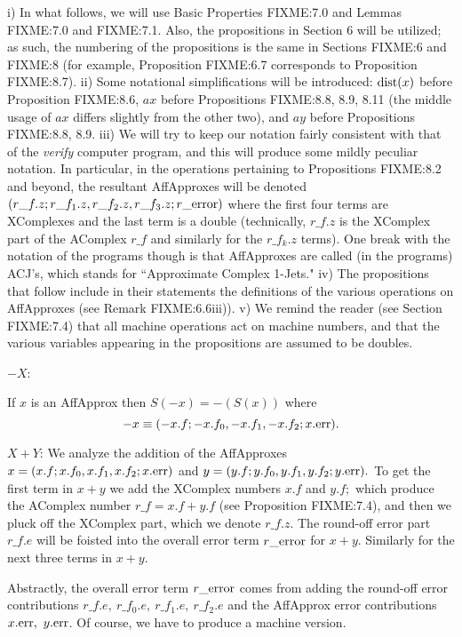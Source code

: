 i)  In what follows, we will use Basic Properties FIXME:7.0 and Lemmas FIXME:7.0 and FIXME:7.1.  Also, the propositions in Section 6
will be utilized;  as such, the numbering of the propositions is the same in Sections FIXME:6 and FIXME:8 (for example,
Proposition FIXME:6.7 corresponds to Proposition FIXME:8.7).  
ii)  Some notational simplifications will be introduced: ${\rm dist}(x)$ before Proposition FIXME:8.6, $ax$ before Propositions FIXME:8.8, 8.9, 8.11
(the middle usage of $ax$ differs slightly from the other two), and $ay$ before Propositions FIXME:8.8, 8.9.
iii)  We will try to keep our notation fairly consistent with that of the {\it verify} computer program, and this will produce some mildly peculiar notation.  In particular, in the operations pertaining to Propositions FIXME:8.2 and beyond, the resultant AffApproxes will be denoted $(r\_f.z; r\_f_1.z, r\_f_2.z, 
r\_f_3.z; r\_{\rm error})$
where the first four terms are XComplexes and the last term is a double (technically, $r\_f.z$ is the XComplex part of the AComplex  $r\_f$ and similarly for the $r\_f_k.z$ terms).  One break with the notation of the programs though is that AffApproxes are called (in the programs) ACJ's, which stands for ``Approximate Complex 1-Jets."
iv) The propositions that follow include in their statements the definitions of the various operations on AffApproxes (see Remark
FIXME:6.6iii)).
v)  We remind the reader (see Section FIXME:7.4) that all machine operations act on machine numbers, and that the 
various variables appearing in the propositions are assumed to be doubles.
\enddemo

$-X$:

If $x$ is an AffApprox 
then $S(-x) = -(S(x))$ where
$$-x \equiv (-x.f; -x.f_0,-x.f_1,-x.f_2; x.{\rm err}).$$ \endproclaim


$X+Y$:
We analyze the addition of the  {\rm AffApproxes} 
 $x = (x.f; x.f_0,x.f_1, x.f_2; x.{\rm err})$  and 
$y = (y.f; y.f_0,y.f_1,y.f_2; y.{\rm err}).$  To get the first term in $x+y$ we add the XComplex numbers $x.f$ and $y.f;$ which
produce the AComplex number $r\_f = x.f + y.f$ (see Proposition FIXME:7.4), and then we pluck off the XComplex part,
which we denote $r\_f.z.$  The round-off error part $r\_f.e$ will be foisted into the overall error term $r\_{\rm error}$
for $x+y.$ Similarly for the next three terms in $x + y.$

Abstractly, the overall error term $r\_{\rm error}$ comes from adding the round-off error contributions $r\_f.e,\  r\_f_0.e,\  r\_f_1.e, 
\ r\_f_2.e$ and the AffApprox error contributions $x.{\rm err},\  y.{\rm err}$.  Of course, we have to produce a machine version.

